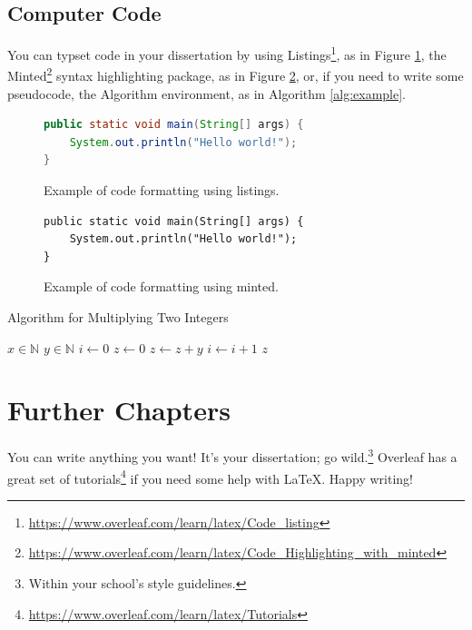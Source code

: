 \documentclass[12pt,reqno,twoside]{amsbook}
\begin{document}
\section{Computer Code}

You can typset code in your dissertation by using Listings\footnote{\url{https://www.overleaf.com/learn/latex/Code_listing}}, as in Figure \ref{code:listings}, the Minted\footnote{\url{https://www.overleaf.com/learn/latex/Code_Highlighting_with_minted}} syntax highlighting package, as in Figure \ref{code:minted}, or, if you need to write some pseudocode, the Algorithm environment, as in Algorithm \ref{alg:example}.

\begin{figure}[h]
\begin{lstlisting}[language=Java]
public static void main(String[] args) {
    System.out.println("Hello world!");
}
\end{lstlisting}
\caption{Example of code formatting using listings.}\label{code:listings}
\end{figure}

\begin{figure}[h]
\begin{verbatim}
public static void main(String[] args) {
    System.out.println("Hello world!");
}
\end{verbatim}
\caption{Example of code formatting using minted.}\label{code:minted}
\end{figure}

\begin{algorithm}
    \caption{Algorithm for Multiplying Two Integers}
    \begin{algorithmic}
        \Require $x\in\mathbb{N}$
        \Require $y\in\mathbb{N}$
        \State $i \gets 0$
        \State $z \gets 0$
            \State $z \gets z + y$
            \State $i \gets i + 1$
        \EndWhile
        \State \Return $z$
    \end{algorithmic}
    \label{alg:example}
\end{algorithm}










\chapter{Further Chapters}

You can write anything you want! It's your dissertation; go wild.\footnote{Within your school's style guidelines.} Overleaf has a great set of tutorials\footnote{\url{https://www.overleaf.com/learn/latex/Tutorials}} if you need some help with \LaTeX. Happy writing!
\end{document}
